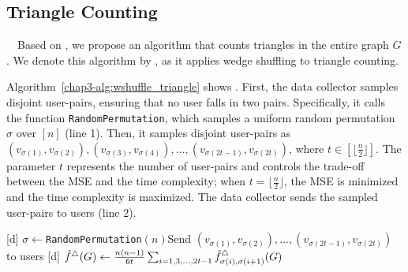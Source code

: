 \subsection{Triangle Counting}
\label{chap3-sub:triangle}
~~Based on
\AlgWSLE{},
we propose an algorithm that counts triangles in the entire graph $G$.
We denote this algorithm by \AlgWSTri{}, as it applies wedge shuffling to triangle counting.

Algorithm~\ref{chap3-alg:wshuffle_triangle} shows \AlgWSTri{}.
First, the data collector samples disjoint user-pairs, 
ensuring that no user falls in two pairs. 
Specifically, it calls the function \texttt{RandomPermutation}, which samples a uniform random permutation $\sigma$ over $[n]$ (line 1).
Then, it samples disjoint user-pairs as
$(v_{\sigma(1)}, v_{\sigma(2)}), (v_{\sigma(3)}, v_{\sigma(4)}), \ldots, (v_{\sigma(2t-1)}, \allowbreak v_{\sigma(2t)})$, where $t \in [\lfloor \frac{n}{2} \rfloor]$.
The parameter $t$ represents the number of user-pairs and controls the trade-off between the MSE and the time complexity;
when $t = \lfloor \frac{n}{2} \rfloor$, the MSE is minimized and the time complexity is maximized.
The data collector sends the sampled user-pairs to users (line 2).

\setlength{\algomargin}{5mm}
\begin{algorithm}[t]
  \SetAlgoLined
  [d] $\sigma \leftarrow$\texttt{RandomPermutation}$(n)$\;
  [d] Send $(v_{\sigma(1)}, v_{\sigma(2)}), \ldots, (v_{\sigma(2t-1)}, v_{\sigma(2t)})$ to users\;
  [d] $\hat{f}^\triangle(G) \leftarrow \frac{n(n-1)}{6t} \sum_{i=1, 3, \ldots, 2t-1} \hat{f}_{\sigma(i),\sigma(i+1)}^\triangle(G)$\;
  [d] 
  \caption{Our triangle counting algorithm \AlgWSTri{}.
  \AlgWSLE{} is shown in Algorithm~\ref{chap3-alg:WSLE}.
  }\label{chap3-alg:wshuffle_triangle}
\end{algorithm}

